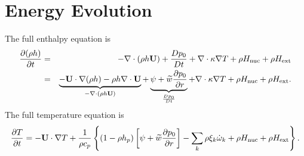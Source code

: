 \documentclass[11pt]{article}
\def\Ub    {{\bf U}}
\def\wt    {\widetilde{w}}
\begin{document}
\section{Energy Evolution}
The full enthalpy equation is
\begin{eqnarray}
\frac{\partial(\rho h)}{\partial t} &=& -\nabla\cdot(\rho h \Ub) + \frac{Dp_0}{Dt} 
+ \nabla\cdot\kappa\nabla T + \rho H_{\rm nuc} + \rho H_{\rm ext} \nonumber \\
&=& \underbrace{-\Ub\cdot\nabla(\rho h) - \rho h\nabla\cdot\Ub}_{-\nabla\cdot(\rho h\Ub)} 
+ \underbrace{\psi + \wt\frac{\partial p_0}{\partial r}}_{\frac{Dp_0}{Dt}} 
+ \nabla\cdot\kappa\nabla T + \rho H_{\rm nuc} + \rho H_{\rm ext}.
\end{eqnarray}
The full temperature equation is
\begin{equation}
\frac{\partial T}{\partial t} = -\Ub\cdot\nabla T
+ \frac{1}{\rho c_p}\left\{(1-\rho h_p)\left[\psi
+ \wt\frac{\partial p_0}{\partial r}\right] - \sum_k\rho\xi_k\dot\omega_k 
+ \rho H_{\rm nuc} + \rho H_{\rm ext}\right\}.
\end{equation}
\end{document}
